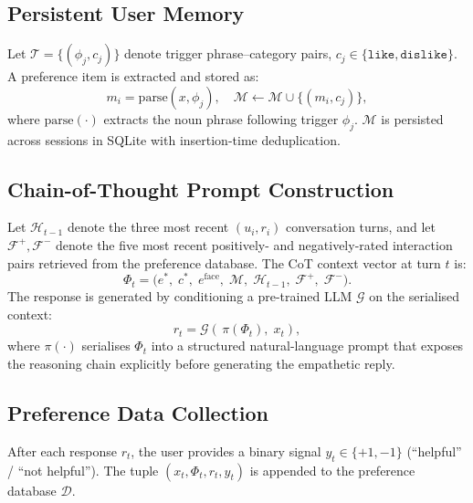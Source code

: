 \documentclass[conference]{IEEEtran}
\begin{document}
\subsection{Persistent User Memory}

Let $\mathcal{T}{=}\{(\phi_j, c_j)\}$ denote trigger
phrase--category pairs, $c_j \in \{\texttt{like},
\texttt{dislike}\}$.
A preference item is extracted and stored as:
\begin{equation}
    m_i = \text{parse}(x, \phi_j), \quad
    \mathcal{M} \leftarrow \mathcal{M} \cup \{(m_i, c_j)\},
    \label{eq:memory}
\end{equation}
where $\text{parse}(\cdot)$ extracts the noun phrase following
trigger $\phi_j$.
$\mathcal{M}$ is persisted across sessions in SQLite with
insertion-time deduplication.

\subsection{Chain-of-Thought Prompt Construction}

Let $\mathcal{H}_{t-1}$ denote the three most recent
$(u_i, r_i)$ conversation turns, and let
$\mathcal{F}^+, \mathcal{F}^-$ denote the five most recent
positively- and negatively-rated interaction pairs retrieved
from the preference database.
The CoT context vector at turn $t$ is:
\begin{equation}
    \Phi_t = \bigl(e^*,\; c^*,\; e^{\text{face}},
               \; \mathcal{M},\; \mathcal{H}_{t-1},\;
               \mathcal{F}^+,\; \mathcal{F}^-\bigr).
    \label{eq:cot_context}
\end{equation}
The response is generated by conditioning a pre-trained LLM
$\mathcal{G}$ on the serialised context:
\begin{equation}
    r_t = \mathcal{G}\!\left(\, \pi(\Phi_t),\; x_t \right),
    \label{eq:generation}
\end{equation}
where $\pi(\cdot)$ serialises $\Phi_t$ into a structured
natural-language prompt that exposes the reasoning chain
explicitly before generating the empathetic reply.

\subsection{Preference Data Collection}

After each response $r_t$, the user provides a binary signal
$y_t \in \{+1, -1\}$ (``helpful'' / ``not helpful'').
The tuple $(x_t, \Phi_t, r_t, y_t)$ is appended to the
preference database $\mathcal{D}$.
\end{document}
